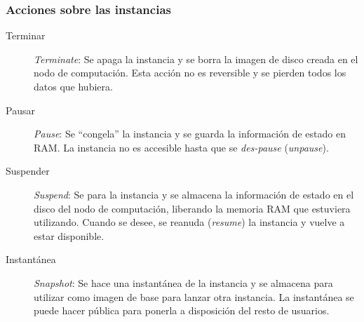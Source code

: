 \documentclass{beamer}
\begin{document}
\begin{frame}
  \frametitle{Acciones sobre las instancias}
    \begin{description}
    \item[Terminar] \textit{Terminate}: Se apaga la instancia y se borra la
      imagen de disco creada en el nodo de computación. Esta acción no es
      reversible y se pierden todos los datos que hubiera.
    \item[Pausar] \textit{Pause}: Se ``congela'' la instancia y se guarda la
      información de estado en RAM. La instancia no es accesible hasta que se
      \textit{des-pause} (\textit{unpause}).
    \item[Suspender] \textit{Suspend}: Se para la instancia y se almacena la
      información de estado en el disco del nodo de computación, liberando la
      memoria RAM que estuviera utilizando. Cuando se desee, se reanuda
      (\textit{resume}) la instancia y vuelve a estar disponible.
    \item [Instantánea] \textit{Snapshot}: Se hace una instantánea de la
      instancia y se almacena para utilizar como imagen de base para lanzar otra
      instancia. La instantánea se puede hacer pública para ponerla a
      disposición del resto de usuarios.
    \end{description}
\end{frame}
\end{document}
